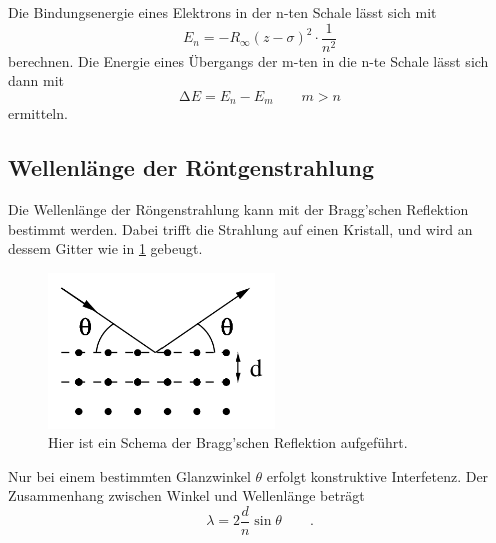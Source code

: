 Die Bindungsenergie eines Elektrons in der n-ten Schale lässt sich mit
\begin{equation}
    E_n=-R_\infty (z-\sigma)^2 \cdot \frac{1}{n^2}
    \label{eqn:Bindungsenergie}
\end{equation}
berechnen.
Die Energie eines Übergangs der m-ten in die n-te Schale lässt sich dann mit 
\begin{equation}
    \increment E=E_n-E_m \qquad m>n
    \label{eqn:Übergangsenergie}
\end{equation}
ermitteln.

\subsection{Wellenlänge der Röntgenstrahlung}
Die Wellenlänge der Röngenstrahlung kann mit der Bragg'schen Reflektion bestimmt werden.
Dabei trifft die Strahlung auf einen Kristall, und wird an dessem Gitter wie in \ref{fig:Bragg} gebeugt. 

\begin{figure}[H]
    \centering
    \includegraphics[width=6cm]{Bilder/Bragg.png}
    \caption{Hier ist ein Schema der Bragg'schen Reflektion aufgeführt.}
    \label{fig:Bragg}
\end{figure}

Nur bei einem bestimmten Glanzwinkel $\theta$ erfolgt konstruktive Interfetenz.
Der Zusammenhang zwischen Winkel und Wellenlänge beträgt
\begin{equation}
    \lambda=2 \frac{d}{n} \sin{\theta} \qquad .
    \label{eqn:Winkel}
\end{equation}



\cite{V602}
